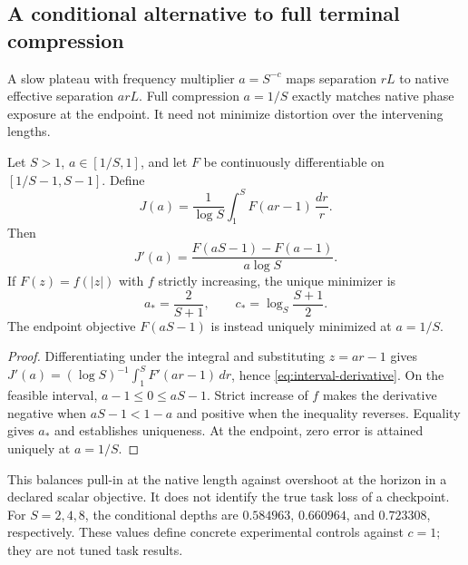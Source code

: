 \subsection{A conditional alternative to full terminal compression}

A slow plateau with frequency multiplier $a=S^{-c}$ maps separation $rL$ to native effective separation $arL$. Full compression $a=1/S$ exactly matches native phase exposure at the endpoint. It need not minimize distortion over the intervening lengths.

\begin{samepage}
\begin{proposition}
\label{prop:interval-depth}
Let $S>1$, $a\in[1/S,1]$, and let $F$ be continuously differentiable on $[1/S-1,S-1]$. Define
\begin{equation}
J(a)=\frac1{\log S}\int_1^S F(ar-1)\,\frac{dr}{r}.
\end{equation}
Then
\begin{equation}
J'(a)=\frac{F(aS-1)-F(a-1)}{a\log S}.
\label{eq:interval-derivative}
\end{equation}
If $F(z)=f(|z|)$ with $f$ strictly increasing, the unique minimizer is
\begin{equation}
a_* = \frac{2}{S+1},\qquad c_* = \log_S\frac{S+1}{2}.
\label{eq:interval-depth-optimum}
\end{equation}
The endpoint objective $F(aS-1)$ is instead uniquely minimized at $a=1/S$.
\end{proposition}
\end{samepage}

\begin{proof}
Differentiating under the integral and substituting $z=ar-1$ gives
$J'(a)=(\log S)^{-1}\int_1^S F'(ar-1)\,dr$, hence \eqref{eq:interval-derivative}.
On the feasible interval, $a-1\le0\le aS-1$. Strict increase of $f$ makes the derivative negative when $aS-1<1-a$ and positive when the inequality reverses. Equality gives $a_*$ and establishes uniqueness. At the endpoint, zero error is attained uniquely at $a=1/S$.
\end{proof}

This balances pull-in at the native length against overshoot at the horizon in a declared scalar objective. It does not identify the true task loss of a checkpoint. For $S=2,4,8$, the conditional depths are $0.584963$, $0.660964$, and $0.723308$, respectively. These values define concrete experimental controls against $c=1$; they are not tuned task results.

